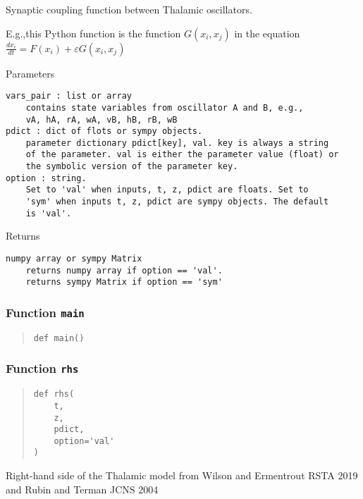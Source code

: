 \documentclass[
  english,
  a4paper,
  oneside]{article}
\begin{document}
Synaptic coupling function between Thalamic oscillators.

E.g.,this Python function is the function \(G(x_i,x_j)\) in the equation
\(\frac{dx_i}{dt} = F(x_i) + \varepsilon G(x_i,x_j)\)

Parameters

\begin{verbatim}
vars_pair : list or array
    contains state variables from oscillator A and B, e.g.,
    vA, hA, rA, wA, vB, hB, rB, wB  
pdict : dict of flots or sympy objects.
    parameter dictionary pdict[key], val. key is always a string
    of the parameter. val is either the parameter value (float) or 
    the symbolic version of the parameter key.
option : string.
    Set to 'val' when inputs, t, z, pdict are floats. Set to
    'sym' when inputs t, z, pdict are sympy objects. The default
    is 'val'.
\end{verbatim}

Returns

\begin{verbatim}
numpy array or sympy Matrix
    returns numpy array if option == 'val'. 
    returns sympy Matrix if option == 'sym'
\end{verbatim}

\hypertarget{Thalamic.main}{%
\subsubsection{\texorpdfstring{Function
\texttt{main}}{Function main}}\label{Thalamic.main}}

\begin{quote}
\begin{verbatim}
def main()
\end{verbatim}
\end{quote}

\hypertarget{Thalamic.rhs}{%
\subsubsection{\texorpdfstring{Function
\texttt{rhs}}{Function rhs}}\label{Thalamic.rhs}}

\begin{quote}
\begin{verbatim}
def rhs(
    t,
    z,
    pdict,
    option='val'
)
\end{verbatim}
\end{quote}

Right-hand side of the Thalamic model from Wilson and Ermentrout RSTA
2019 and Rubin and Terman JCNS 2004
\end{document}
